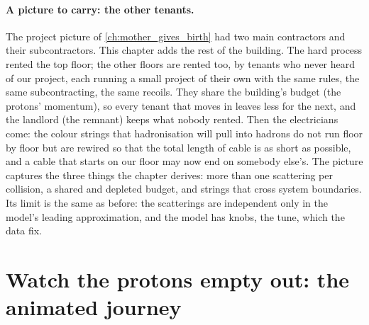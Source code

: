 \paragraph{A picture to carry: the other tenants.} The project picture of
\cref{ch:mother_gives_birth} had two main contractors and their
subcontractors. This chapter adds the rest of the building. The hard process
rented the top floor; the other floors are rented too, by tenants who never
heard of our project, each running a small project of their own with the
same rules, the same subcontracting, the same recoils. They share the
building's budget (the protons' momentum), so every tenant that moves in
leaves less for the next, and the landlord (the remnant) keeps what nobody
rented. Then the electricians come: the colour strings that hadronisation
will pull into hadrons do not run floor by floor but are rewired so that
the total length of cable is as short as possible, and a cable that starts
on our floor may now end on somebody else's. The picture captures the three
things the chapter derives: more than one scattering per collision, a
shared and depleted budget, and strings that cross system boundaries. Its
limit is the same as before: the scatterings are independent only in the
model's leading approximation, and the model has knobs, the tune, which
the data fix.

\section{Watch the protons empty out: the animated journey}
\label{sec:uninvited_cousins:animation}


